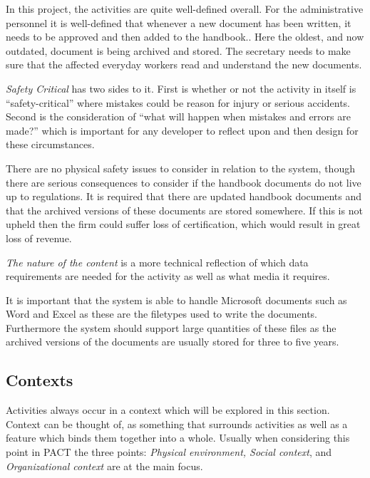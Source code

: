 In this project, the activities are quite well-defined overall.
For the administrative personnel it is well-defined that whenever a new document has been written, it needs to be approved and then added to the handbook..
Here the oldest, and now outdated, document is being archived and stored.
The secretary needs to make sure that the affected everyday workers read and understand the new documents.


\textit{Safety Critical} has two sides to it.
First is whether or not the activity in itself is ``safety-critical'' where mistakes could be reason for injury or serious accidents.
Second is the consideration of ``what will happen when mistakes and errors are made?'' which is important for any developer to reflect upon and then design for these circumstances.
\citep{Benyon}

There are no physical safety issues to consider in relation to the system, though there are serious consequences to consider if the handbook documents do not live up to regulations.
It is required that there are updated handbook documents and that the archived versions of these documents are stored somewhere.
If this is not upheld then the firm could suffer loss of certification, which would result in great loss of revenue.

\textit{The nature of the content} is a more technical reflection of which data requirements are needed for the activity as well as what media it requires.
\citep{Benyon}

It is important that the system is able to handle Microsoft documents such as Word and Excel as these are the filetypes used to write the documents.
Furthermore the system should support large quantities of these files as the archived versions of the documents are usually stored for three to five years.

\subsection{Contexts}
Activities always occur in a context which will be explored in this section.
Context can be thought of, as something that surrounds activities as well as a feature which binds them together into a whole.
Usually when considering this point in PACT the three points: \textit{Physical environment, Social context}, and \textit{Organizational context} are at the main focus.
\citep{Benyon}

